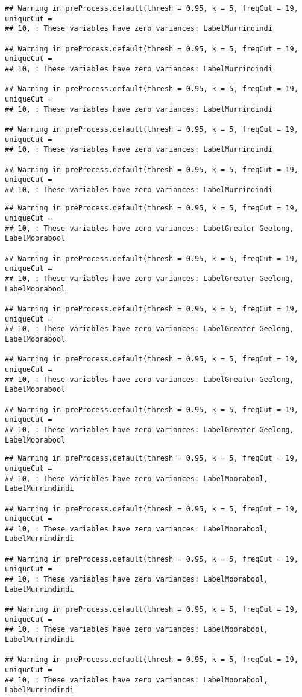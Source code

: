 \documentclass[
]{article}
\begin{document}
\begin{verbatim}
## Warning in preProcess.default(thresh = 0.95, k = 5, freqCut = 19, uniqueCut =
## 10, : These variables have zero variances: LabelMurrindindi

## Warning in preProcess.default(thresh = 0.95, k = 5, freqCut = 19, uniqueCut =
## 10, : These variables have zero variances: LabelMurrindindi

## Warning in preProcess.default(thresh = 0.95, k = 5, freqCut = 19, uniqueCut =
## 10, : These variables have zero variances: LabelMurrindindi

## Warning in preProcess.default(thresh = 0.95, k = 5, freqCut = 19, uniqueCut =
## 10, : These variables have zero variances: LabelMurrindindi

## Warning in preProcess.default(thresh = 0.95, k = 5, freqCut = 19, uniqueCut =
## 10, : These variables have zero variances: LabelMurrindindi
\end{verbatim}

\begin{verbatim}
## Warning in preProcess.default(thresh = 0.95, k = 5, freqCut = 19, uniqueCut =
## 10, : These variables have zero variances: LabelGreater Geelong, LabelMoorabool

## Warning in preProcess.default(thresh = 0.95, k = 5, freqCut = 19, uniqueCut =
## 10, : These variables have zero variances: LabelGreater Geelong, LabelMoorabool

## Warning in preProcess.default(thresh = 0.95, k = 5, freqCut = 19, uniqueCut =
## 10, : These variables have zero variances: LabelGreater Geelong, LabelMoorabool

## Warning in preProcess.default(thresh = 0.95, k = 5, freqCut = 19, uniqueCut =
## 10, : These variables have zero variances: LabelGreater Geelong, LabelMoorabool

## Warning in preProcess.default(thresh = 0.95, k = 5, freqCut = 19, uniqueCut =
## 10, : These variables have zero variances: LabelGreater Geelong, LabelMoorabool
\end{verbatim}

\begin{verbatim}
## Warning in preProcess.default(thresh = 0.95, k = 5, freqCut = 19, uniqueCut =
## 10, : These variables have zero variances: LabelMoorabool, LabelMurrindindi

## Warning in preProcess.default(thresh = 0.95, k = 5, freqCut = 19, uniqueCut =
## 10, : These variables have zero variances: LabelMoorabool, LabelMurrindindi

## Warning in preProcess.default(thresh = 0.95, k = 5, freqCut = 19, uniqueCut =
## 10, : These variables have zero variances: LabelMoorabool, LabelMurrindindi

## Warning in preProcess.default(thresh = 0.95, k = 5, freqCut = 19, uniqueCut =
## 10, : These variables have zero variances: LabelMoorabool, LabelMurrindindi

## Warning in preProcess.default(thresh = 0.95, k = 5, freqCut = 19, uniqueCut =
## 10, : These variables have zero variances: LabelMoorabool, LabelMurrindindi
\end{verbatim}
\end{document}
